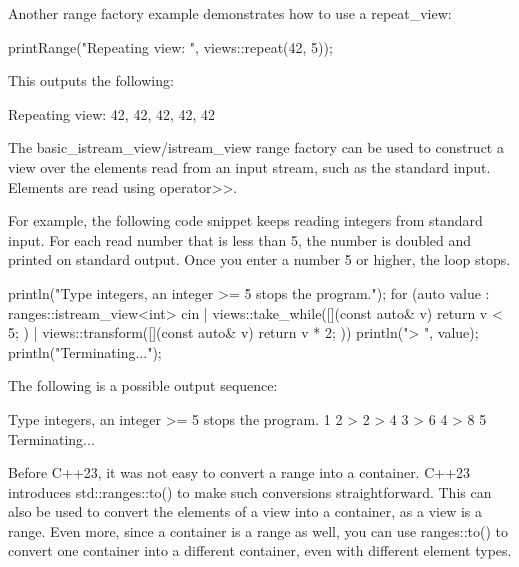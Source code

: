 
Another range factory example demonstrates how to use a repeat\_view:

\begin{cpp}
printRange("Repeating view: ", views::repeat(42, 5));
\end{cpp}

This outputs the following:

\begin{shell}
Repeating view: 42, 42, 42, 42, 42
\end{shell}


The basic\_istream\_view/istream\_view range factory can be used to construct a view over the elements read from an input stream, such as the standard input. Elements are read using operator>{}>.

For example, the following code snippet keeps reading integers from standard input. For each read number that is less than 5, the number is doubled and printed on standard output. Once you enter a number 5 or higher, the loop stops.

\begin{cpp}
println("Type integers, an integer >= 5 stops the program.");
for (auto value : ranges::istream_view<int> { cin }
    | views::take_while([](const auto& v) { return v < 5; })
    | views::transform([](const auto& v) { return v * 2; })) {
    println("> {}", value);
}
println("Terminating...");
\end{cpp}

The following is a possible output sequence:

\begin{shell}
Type integers, an integer >= 5 stops the program.
1 2
> 2
> 4
3
> 6
4
> 8
5
Terminating...
\end{shell}



Before C++23, it was not easy to convert a range into a container. C++23 introduces std::ranges::to() to make such conversions straightforward. This can also be used to convert the elements of a view into a container, as a view is a range. Even more, since a container is a range as well, you can use ranges::to() to convert one container into a different container, even with different element types.

